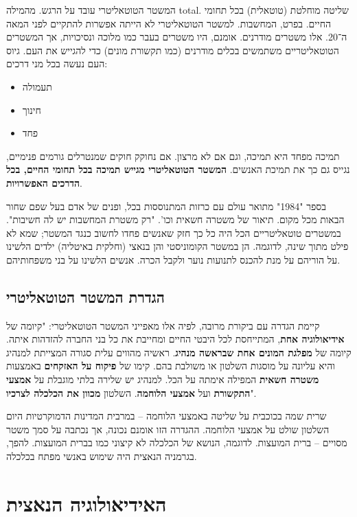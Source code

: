 \documentclass[a4paper]{book}
\begin{document}
	המשטר הטוטאליטרי עובד על הרגש. מהמילה total. שליטה מוחלטת (טוטאלית) בכל תחומי החיים. בפרט, המחשבות. 
	למשטר הטוטאליטרי לא הייתה אפשרות להתקיים לפני המאה ה־20. אלו משטרים מודרנים. אומנם, היו משטרים בעבר כמו מלוכה ונסיכויות, אך המשטרים הטוטאליטריים משתמשים בכלים מודרנים (כמו תקשורת מונים) כדי להגייש את העם. גיוס העם נעשה בכל מני דרכים: 
	\begin{multicols}{2}
		\begin{itemize}
			\item תעמולה
			\item חינוך
			\item פחד
		\end{itemize}
	\end{multicols}
	תמיכה מפחד היא תמיכה, וגם אם לא מרצון. אם נחוקק חוקים שמנטרלים גורמים פנימיים, נגייס גם כך את תמיכת האנשים. \textbf{המשטר הטוטאליטרי מגייש תמיכה בכל תחומי החיים, בכל הדרכים האפשרויות}. 
	
	בספר "1984" מתואר עולם עם כרזות המתנוססות בכל, ופנים של אדם בעל שפם שחור הבאות מכל מקום. תיאור של משטרה חשאית וכו'. "רק משטרת המחשבות יש לה חשיבות". במשטרים טוטאליטריים הכל היה כל כך חזק שאנשים פחדו לחשוב כנגד המשטר; שמא לא פילט מתוך שינה, לדוגמה. הן במשטר הקומוניסטי והן בנאצי (וחלקית באיטליה) ילדים הלשינו על הוריהם על מנת להכנס לתנועות נוער ולקבל הכרה. אנשים הלשינו על בני משפחותיהם. 
	
	\subsection{הגדרת המשטר הטוטאליטרי}
	
	קיימת הגדרה עם ביקורת מרובה, לפיה אלו מאפייני המשטר הטוטאליטרי: "קיומה של \textbf{אידיאולוגיה אחת}, המתייחסת לכל היבטי החיים ומחייבת את כל בני החברה להזדהות איתה. קיומה של \textbf{מפלגת המונים אחת שבראשה מנהיג}. ראשיה מהווים עלית סגורה המצייתת למנהיג והיא עליונה על מוסגות השלטון או משולבת בהם. קימו של \textbf{פיקוח על האזקחים} באמצעות \textbf{משטרה חשאית} המפילה אימתה על הכל. למנהיג יש שלירה בלתי מוגבלת על \textbf{אמצעי התקשורת}  ועל \textbf{אמצעי הלוחמה}. השלטון \textbf{מכוון את הכלכלה לצרכיו}". 
	
	שרית שמה בכוכבית על שליטה באמצעי הלוחמה – במרבית המדינות הדמוקרטיות היום השלטון שולט על אמצעי הלוחמה. ההגדרה הזו אומנם נכונה, אך נכתבה על סמך משטר מסויים – ברית המועצות. לדוגמה, הנושא של הכלכלה לא קיצוני כמו בברית המועצות. להפך, בגרמניה הנאצית היה שימוש באנשי מפתח בכלכלה. 
	
	
	\section{האידיאולוגיה הנאצית}
\end{document}
